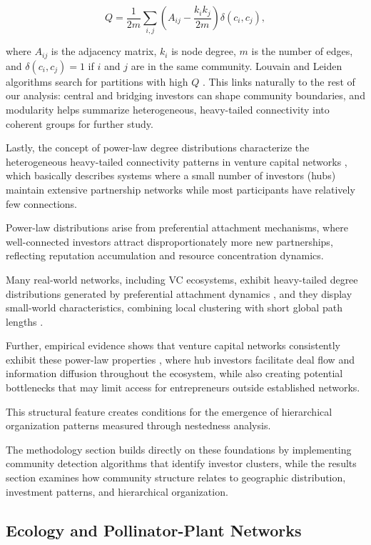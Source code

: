 \[
Q=\frac{1}{2m}\sum_{i,j}\left(A_{ij}-\frac{k_i k_j}{2m}\right)\delta(c_i,c_j),
\]

where $A_{ij}$ is the adjacency matrix, $k_i$ is node degree, $m$ is the number of edges, and $\delta(c_i,c_j)=1$ if $i$ and $j$ are in the same community. Louvain and Leiden algorithms search for partitions with high $Q$ \cite{Blondel2008,Traag2019}. This links naturally to the rest of our analysis: central and bridging investors can shape community boundaries, and modularity helps summarize heterogeneous, heavy-tailed connectivity into coherent groups for further study.

Lastly, the concept of power-law degree distributions characterize the heterogeneous heavy-tailed connectivity patterns in venture capital networks \cite{Bygrave1987}, which basically describes systems where a small number of investors (hubs) maintain extensive partnership networks while most participants have relatively few connections.

Power-law distributions arise from preferential attachment mechanisms, where well-connected investors attract disproportionately more new partnerships, reflecting reputation accumulation and resource concentration dynamics.

Many real-world networks, including VC ecosystems, exhibit heavy-tailed degree distributions generated by preferential attachment dynamics \cite{Barabasi1999}, and they display small-world characteristics, combining local clustering with short global path lengths \cite{Watts1998}. 

Further, empirical evidence shows that venture capital networks consistently exhibit these power-law properties \cite{Dalle2025}, where hub investors facilitate deal flow and information diffusion throughout the ecosystem, while also creating potential bottlenecks that may limit access for entrepreneurs outside established networks. 

This structural feature creates conditions for the emergence of hierarchical organization patterns measured through nestedness analysis.

The methodology section builds directly on these foundations by implementing community detection algorithms that identify investor clusters, while the results section examines how community structure relates to geographic distribution, investment patterns, and hierarchical organization.

\subsection{Ecology and Pollinator-Plant Networks}

